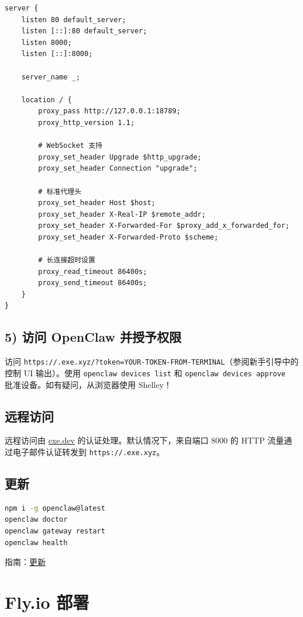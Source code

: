 \begin{lstlisting}
server {
    listen 80 default_server;
    listen [::]:80 default_server;
    listen 8000;
    listen [::]:8000;

    server_name _;

    location / {
        proxy_pass http://127.0.0.1:18789;
        proxy_http_version 1.1;

        # WebSocket 支持
        proxy_set_header Upgrade $http_upgrade;
        proxy_set_header Connection "upgrade";

        # 标准代理头
        proxy_set_header Host $host;
        proxy_set_header X-Real-IP $remote_addr;
        proxy_set_header X-Forwarded-For $proxy_add_x_forwarded_for;
        proxy_set_header X-Forwarded-Proto $scheme;

        # 长连接超时设置
        proxy_read_timeout 86400s;
        proxy_send_timeout 86400s;
    }
}
\end{lstlisting}


\subsection{5) 访问 OpenClaw 并授予权限}


访问 \texttt{https://.exe.xyz/?token=YOUR-TOKEN-FROM-TERMINAL}（参阅新手引导中的控制 UI 输出）。使用 \texttt{openclaw devices list} 和 \texttt{openclaw devices approve } 批准设备。如有疑问，从浏览器使用 Shelley！

\subsection{远程访问}


远程访问由 \href{https://exe.dev}{exe.dev} 的认证处理。默认情况下，来自端口 8000 的 HTTP 流量通过电子邮件认证转发到 \texttt{https://.exe.xyz}。

\subsection{更新}


\begin{lstlisting}[language=bash]
npm i -g openclaw@latest
openclaw doctor
openclaw gateway restart
openclaw health
\end{lstlisting}


指南：\href{/install/updating}{更新}


\clearpage

\section{Fly.io 部署}



